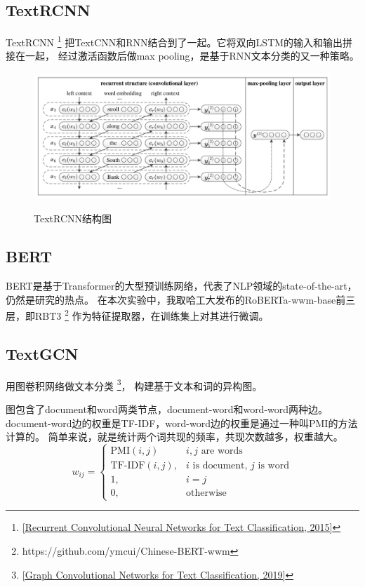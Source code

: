 \documentclass[12pt, UTF8, a4paper]{ctexart}
\begin{document}
\subsection{TextRCNN}

TextRCNN
\footnote{\href{http://www.aaai.org/ocs/index.php/AAAI/AAAI15/paper/download/9745/9552}
{[Recurrent Convolutional Neural Networks for Text Classification, 2015]}}
把TextCNN和RNN结合到了一起。它将双向LSTM的输入和输出拼接在一起，
经过激活函数后做max pooling，是基于RNN文本分类的又一种策略。


\begin{figure}[htb]
    \centering
    \includegraphics[width=5.6in, keepaspectratio]{./pic/rcnn.png}\\
    \caption{TextRCNN结构图}
\end{figure}


\subsection{BERT}

BERT是基于Transformer的大型预训练网络，代表了NLP领域的state-of-the-art，
仍然是研究的热点。
在本次实验中，我取哈工大发布的RoBERTa-wwm-base前三层，即RBT3
\footnote{https://github.com/ymcui/Chinese-BERT-wwm}
作为特征提取器，在训练集上对其进行微调。

\subsection{TextGCN}

用图卷积网络做文本分类
\footnote{\href{https://arxiv.org/abs/1809.05679}
{[Graph Convolutional Networks for Text Classification, 2019]}}，
构建基于文本和词的异构图。

图包含了document和word两类节点，document-word和word-word两种边。
document-word边的权重是TF-IDF，word-word边的权重是通过一种叫PMI的方法计算的。
简单来说，就是统计两个词共现的频率，共现次数越多，权重越大。
$$
w_{ij} =
\begin{cases}
  \text{PMI}(i, j)  & i, j \text{ are words}\\
  \text{TF-IDF}(i, j), & i \text{ is document, }j \text{ is word}\\
  1, & i = j\\
  0, & \text{otherwise}
\end{cases}
$$
\end{document}

